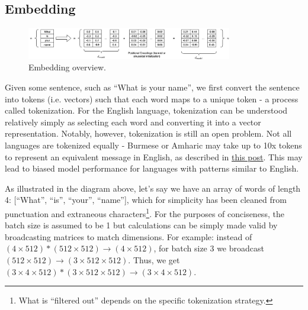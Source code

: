 \documentclass[12pt]{article}
\begin{document}
\subsection{Embedding}\label{sec: embedding}
\begin{figure}[H]
    \centering
    \includegraphics[width=0.8\textwidth]{../media/embedding.png}
    \caption{Embedding overview. }
    \label{fig:embedding}
\end{figure}

Given some sentence, such as \enquote{What is your name}, we first convert the sentence into tokens (i.e. vectors) such that each word maps to a unique token - a process called tokenization. For the English language, tokenization can be understood relatively simply as selecting each word and converting it into a vector representation. Notably, however, tokenization is still an open problem. Not all languages are tokenized equally - 
Burmese or Amharic may take up to 10x tokens to represent an equivalent message in English, as described in \href{https://medium.com/data-science/all-languages-are-not-created-tokenized-equal-cd87694a97c1}{this post}. This may lead to biased model performance for languages with patterns similar to English. 

As illustrated in the diagram above, let's say we have an array of words of length 4: [\enquote{What}, \enquote{is}, \enquote{your}, \enquote{name}], which for simplicity has been cleaned from punctuation and extraneous characters\footnote{What is \enquote{filtered out} depends on the specific tokenization strategy.}. For the purposes of conciseness, the batch size is assumed to be 1 but calculations can be simply made valid by broadcasting matrices to match dimensions. For example: instead of $(4 \times 512) * (512 \times 512) \rightarrow (4 \times 512)$, for batch size 3 we broadcast $(512 \times 512) \rightarrow (3 \times 512 \times 512)$. Thus, we get $(3 \times 4 \times 512) * (3 \times 512 \times 512) \rightarrow (3 \times 4 \times 512)$.
\end{document}
